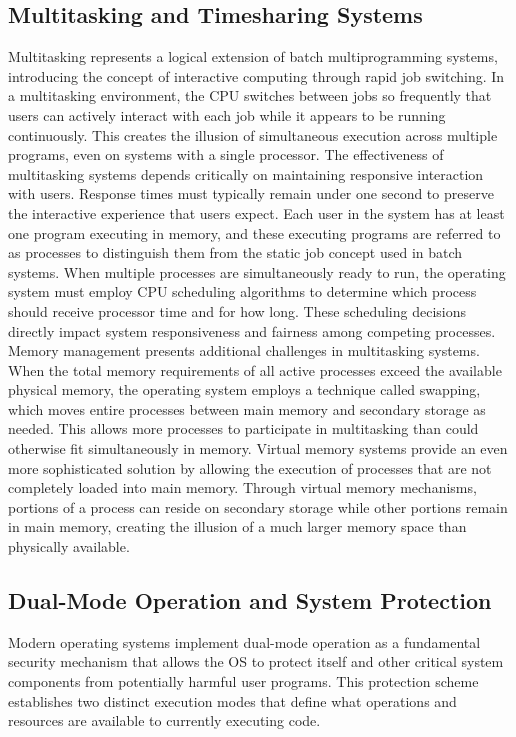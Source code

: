     \subsection{Multitasking and Timesharing Systems}

Multitasking represents a logical extension of batch multiprogramming systems, introducing the concept of interactive computing through rapid job switching. In a multitasking environment, the CPU switches between jobs so frequently that users can actively interact with each job while it appears to be running continuously. This creates the illusion of simultaneous execution across multiple programs, even on systems with a single processor.
The effectiveness of multitasking systems depends critically on maintaining responsive interaction with users. Response times must typically remain under one second to preserve the interactive experience that users expect. Each user in the system has at least one program executing in memory, and these executing programs are referred to as processes to distinguish them from the static job concept used in batch systems.
When multiple processes are simultaneously ready to run, the operating system must employ CPU scheduling algorithms to determine which process should receive processor time and for how long. These scheduling decisions directly impact system responsiveness and fairness among competing processes.
Memory management presents additional challenges in multitasking systems. When the total memory requirements of all active processes exceed the available physical memory, the operating system employs a technique called swapping, which moves entire processes between main memory and secondary storage as needed. This allows more processes to participate in multitasking than could otherwise fit simultaneously in memory.
Virtual memory systems provide an even more sophisticated solution by allowing the execution of processes that are not completely loaded into main memory. Through virtual memory mechanisms, portions of a process can reside on secondary storage while other portions remain in main memory, creating the illusion of a much larger memory space than physically available.


    \subsection{Dual-Mode Operation and System Protection}

    Modern operating systems implement dual-mode operation as a fundamental security mechanism that allows the OS to protect itself and other critical system components from potentially harmful user programs. This protection scheme establishes two distinct execution modes that define what operations and resources are available to currently executing code.


